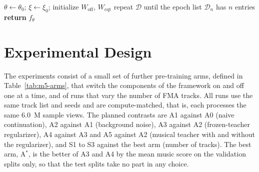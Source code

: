 \documentclass{FastFyp}
\begin{document}
\begin{algorithm}[htbp]
\caption{Further pre-training with the M2D-X-Music objective}
\label{alg:m5-train}
$\theta\leftarrow\theta_0$; $\xi\leftarrow\xi_0$; initialize $W_{\mathrm{off}}$, $W_{\mathrm{cqt}}$\;
repeat $\mathcal{D}$ until the epoch list $\mathcal{D}_n$ has $n$ entries\;
\textbf{return} $f_\theta$\;
\end{algorithm}


\section{Experimental Design}
\label{sec:m5-design}
The experiments consist of a small set of further pre-training arms, defined in Table~\ref{tab:m5-arms}, that switch the components of the framework on and off one at a time, and of runs that vary the number of FMA tracks. All runs use the same track list and seeds and are compute-matched, that is, each processes the same 6.0~M sample views. The planned contrasts are A1 against A0 (naive continuation), A2 against A1 (background noise), A3 against A2 (frozen-teacher regularizer), A4 against A3 and A5 against A2 (musical teacher with and without the regularizer), and S1 to S3 against the best arm (number of tracks). The best arm, A$^{*}$, is the better of A3 and A4 by the mean music score on the validation splits only, so that the test splits take no part in any choice.
\end{document}
